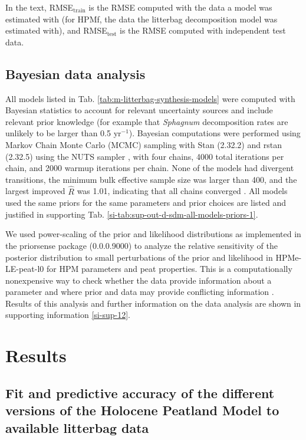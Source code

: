 \documentclass[esd, manuscript]{copernicus}
\begin{document}
In the text, RMSE\(_\text{train}\) is the RMSE computed with the data a model was estimated with (for HPMf, the data the litterbag decomposition model was estimated with), and RMSE\(_\text{test}\) is the RMSE computed with independent test data.

\hypertarget{sdm-003-methods-13}{%
\subsection{Bayesian data analysis}\label{sdm-003-methods-13}}

All models listed in Tab. \ref{tab:m-litterbag-synthesis-models} were computed with Bayesian statistics to account for relevant uncertainty sources and include relevant prior knowledge (for example that \emph{Sphagnum} decomposition rates are unlikely to be larger than 0.5 yr\(^{-1}\)). Bayesian computations were performed using Markov Chain Monte Carlo (MCMC) sampling with Stan (2.32.2) \citep{StanDevelopmentTeam.2021a} and rstan (2.32.5) \citep{StanDevelopmentTeam.2021b} using the NUTS sampler \citep{Hoffman.2014}, with four chains, 4000 total iterations per chain, and 2000 warmup iterations per chain. None of the models had divergent transitions, the minimum bulk effective sample size was larger than 400, and the largest improved \(\hat{R}\) was 1.01, indicating that all chains converged \citep{Vehtari.2021}. All models used the same priors for the same parameters and prior choices are listed and justified in supporting Tab. \ref{si-tab:sup-out-d-sdm-all-models-priors-1}.

We used power-scaling of the prior and likelihood distributions as implemented in the priorsense package (0.0.0.9000) \citep{Kallioinen.2024} to analyze the relative sensitivity of the posterior distribution to small perturbations of the prior and likelihood in HPMe-LE-peat-l0 for HPM parameters and peat properties. This is a computationally nonexpensive way to check whether the data provide information about a parameter and where prior and data may provide conflicting information \citep{Kallioinen.2024}. Results of this analysis and further information on the data analysis are shown in supporting information \ref{si-sup-12}.

\section{Results}

\subsection{Fit and predictive accuracy of the different versions of the Holocene Peatland Model to available litterbag data}
\end{document}
